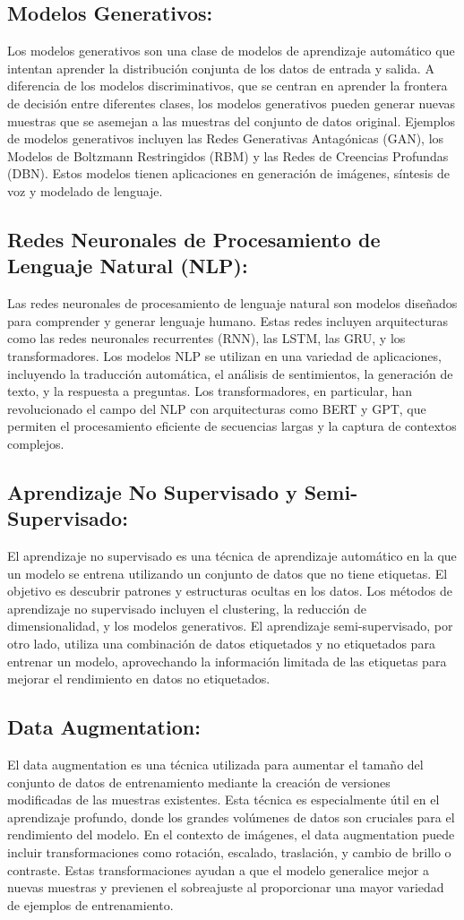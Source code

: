 \subsection{Modelos Generativos: }
Los modelos generativos son una clase de modelos de aprendizaje automático que intentan aprender la distribución conjunta de los datos de entrada y salida. A diferencia de los modelos discriminativos, que se centran en aprender la frontera de decisión entre diferentes clases, los modelos generativos pueden generar nuevas muestras que se asemejan a las muestras del conjunto de datos original. Ejemplos de modelos generativos incluyen las Redes Generativas Antagónicas (GAN), los Modelos de Boltzmann Restringidos (RBM) y las Redes de Creencias Profundas (DBN). Estos modelos tienen aplicaciones en generación de imágenes, síntesis de voz y modelado de lenguaje.
\subsection{Redes Neuronales de Procesamiento de Lenguaje Natural (NLP): }
Las redes neuronales de procesamiento de lenguaje natural son modelos diseñados para comprender y generar lenguaje humano. Estas redes incluyen arquitecturas como las redes neuronales recurrentes (RNN), las LSTM, las GRU, y los transformadores. Los modelos NLP se utilizan en una variedad de aplicaciones, incluyendo la traducción automática, el análisis de sentimientos, la generación de texto, y la respuesta a preguntas. Los transformadores, en particular, han revolucionado el campo del NLP con arquitecturas como BERT y GPT, que permiten el procesamiento eficiente de secuencias largas y la captura de contextos complejos.
\subsection{Aprendizaje No Supervisado y Semi-Supervisado: }
El aprendizaje no supervisado es una técnica de aprendizaje automático en la que un modelo se entrena utilizando un conjunto de datos que no tiene etiquetas. El objetivo es descubrir patrones y estructuras ocultas en los datos. Los métodos de aprendizaje no supervisado incluyen el clustering, la reducción de dimensionalidad, y los modelos generativos. El aprendizaje semi-supervisado, por otro lado, utiliza una combinación de datos etiquetados y no etiquetados para entrenar un modelo, aprovechando la información limitada de las etiquetas para mejorar el rendimiento en datos no etiquetados.
\subsection{Data Augmentation: }
El data augmentation es una técnica utilizada para aumentar el tamaño del conjunto de datos de entrenamiento mediante la creación de versiones modificadas de las muestras existentes. Esta técnica es especialmente útil en el aprendizaje profundo, donde los grandes volúmenes de datos son cruciales para el rendimiento del modelo. En el contexto de imágenes, el data augmentation puede incluir transformaciones como rotación, escalado, traslación, y cambio de brillo o contraste. Estas transformaciones ayudan a que el modelo generalice mejor a nuevas muestras y previenen el sobreajuste al proporcionar una mayor variedad de ejemplos de entrenamiento.